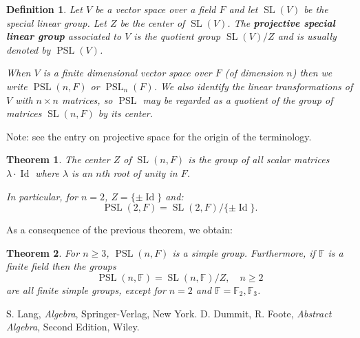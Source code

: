 \documentclass[12pt]{article}
\newtheorem{thm}{Theorem}
\newtheorem*{defn}{Definition}
\theoremstyle{definition}
\newcommand{\SL}{\operatorname{SL}}
\newcommand{\PSL}{\operatorname{PSL}}
\begin{document}
\begin{defn}
Let $V$ be a vector space over a field $F$ and let $\SL(V)$ be the special linear group. Let $Z$ be the center of $\SL(V)$. The {\bf projective special linear group} associated to $V$ is the quotient group $\SL(V)/Z$ and is usually denoted by $\PSL(V)$. 

When $V$ is a finite dimensional vector space over $F$ (of dimension $n$) then we write $\PSL(n,F)$ or $\PSL_n(F)$. We also identify the linear transformations of $V$ with $n\times n$ matrices, so $\PSL$ may be regarded as a quotient of the group of matrices $\SL(n,F)$ by its center.
\end{defn}

Note: see the entry on projective space for the origin of the terminology.

\begin{thm}
The center $Z$ of $\SL(n,F)$ is the group of all scalar matrices $\lambda\cdot \operatorname{Id}$ where $\lambda$ is an $n$th root of unity in $F$.

In particular, for $n=2$, $Z=\{ \pm \operatorname{Id} \}$ and:
$$\PSL(2,F)=\SL(2,F)/\{ \pm \operatorname{Id} \}.$$
\end{thm}

As a consequence of the previous theorem, we obtain:

\begin{thm}
For $n\geq 3$, $\PSL(n,F)$ is a simple group. 
Furthermore, if $\mathbb{F}$ is a finite field then the groups 
$$\PSL(n,\mathbb{F})=\SL(n,\mathbb{F})/Z,\quad n\geq 2$$
are all finite simple groups, except for $n=2$ and $\mathbb{F}=\mathbb{F}_2,\mathbb{F}_3$.
\end{thm}

\begin{thebibliography}{00}
 S. Lang, {\em Algebra}, Springer-Verlag, New York.
 D. Dummit, R. Foote, {\em Abstract Algebra},
Second Edition, Wiley.
\end{thebibliography}
\end{document}
